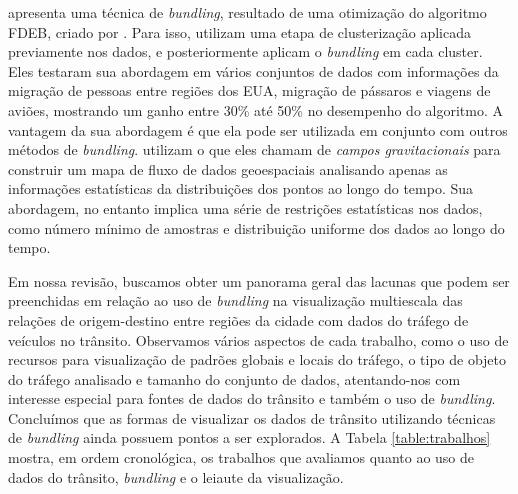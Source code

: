 \citet{Anita2017} apresenta uma técnica de \emph{bundling}, resultado de uma
otimização do algoritmo FDEB, criado por \citet{Selassie2011}. Para isso,
utilizam uma etapa de clusterização aplicada previamente nos dados, e
posteriormente aplicam o \emph{bundling} em cada cluster. Eles testaram sua
abordagem em vários conjuntos de dados com informações da migração de pessoas
entre regiões dos EUA, migração de pássaros e viagens de aviões, mostrando um
ganho entre 30\% até 50\% no desempenho do algoritmo. A vantagem da sua
abordagem é que ela pode ser utilizada em conjunto com outros métodos de
\emph{bundling}. \citet{Kim2018} utilizam o que eles chamam de \emph{campos
gravitacionais} para construir um mapa de fluxo de dados geoespaciais
analisando apenas as informações estatísticas da distribuições dos pontos ao
longo do tempo. Sua abordagem, no entanto implica uma série de restrições
estatísticas nos dados, como número mínimo de amostras e distribuição uniforme
dos dados ao longo do tempo.

  Em nossa revisão, buscamos obter um panorama geral das lacunas que podem ser
preenchidas em relação ao uso de \emph{bundling} na visualização multiescala
das relações de origem-destino entre regiões da cidade com dados do tráfego de
veículos no trânsito. Observamos vários aspectos de cada trabalho, como o uso
de recursos para visualização de padrões globais e locais do tráfego, o tipo de
objeto do tráfego analisado e tamanho do conjunto de dados, atentando-nos com
interesse especial para fontes de dados do trânsito e também o uso de
\emph{bundling}. Concluímos que as formas de visualizar os dados de trânsito
utilizando técnicas de \emph{bundling} ainda possuem pontos a ser explorados. A
Tabela \ref{table:trabalhos} mostra, em ordem cronológica, os trabalhos que
avaliamos quanto ao uso de dados do trânsito, \emph{bundling} e o leiaute da
visualização.

